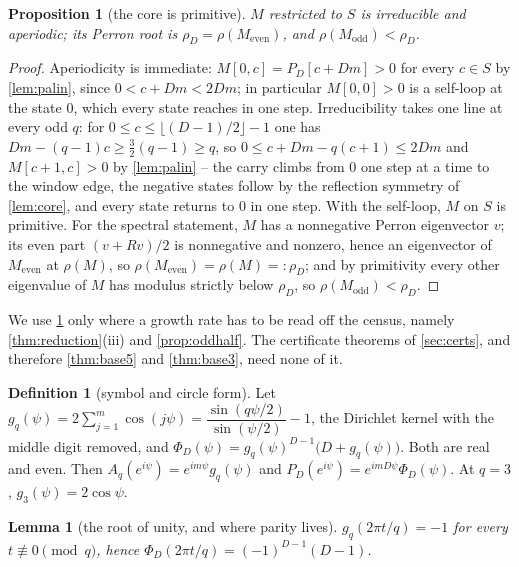 \documentclass[11pt]{amsart}
\newtheorem{proposition}[theorem]{Proposition}
\newtheorem{lemma}[theorem]{Lemma}
\theoremstyle{definition}
\newtheorem{definition}[theorem]{Definition}
\theoremstyle{remark}
\begin{document}
\begin{proposition}[the core is primitive]
\label{prop:core}
$M$ restricted to $S$ is irreducible and aperiodic; its Perron root is $\rho_D = \rho(M_{\mathrm{even}})$, and $\rho(M_{\mathrm{odd}}) < \rho_D$.
\end{proposition}

\begin{proof}
Aperiodicity is immediate: $M[0,c] = P_D[c + Dm] > 0$ for every $c \in S$ by \cref{lem:palin}, since $0 < c + Dm < 2Dm$; in particular $M[0,0] > 0$ is a self-loop at the state $0$, which every state reaches in one step. Irreducibility takes one line at every odd $q$: for $0 \le c \le \lfloor(D-1)/2\rfloor - 1$ one has $Dm - (q-1)c \ge \tfrac32(q-1) \ge q$, so $0 \le c + Dm - q(c+1) \le 2Dm$ and $M[c+1,c] > 0$ by \cref{lem:palin} -- the carry climbs from $0$ one step at a time to the window edge, the negative states follow by the reflection symmetry of \cref{lem:core}, and every state returns to $0$ in one step. With the self-loop, $M$ on $S$ is primitive. For the spectral statement, $M$ has a nonnegative Perron eigenvector $v$; its even part $(v + Rv)/2$ is nonnegative and nonzero, hence an eigenvector of $M_{\mathrm{even}}$ at $\rho(M)$, so $\rho(M_{\mathrm{even}}) = \rho(M) =: \rho_D$; and by primitivity every other eigenvalue of $M$ has modulus strictly below $\rho_D$, so $\rho(M_{\mathrm{odd}}) < \rho_D$.
\end{proof}

We use \cref{prop:core} only where a growth rate has to be read off the census, namely \cref{thm:reduction}(iii) and \cref{prop:oddhalf}. The certificate theorems of \cref{sec:certs}, and therefore \cref{thm:base5} and \cref{thm:base3}, need none of it.

\begin{definition}[symbol and circle form]
\label{def:symbol}
Let $g_q(\psi) = 2\sum_{j=1}^{m}\cos(j\psi) = \dfrac{\sin(q\psi/2)}{\sin(\psi/2)} - 1$, the Dirichlet kernel with the middle digit removed, and $\Phi_D(\psi) = g_q(\psi)^{D-1}\bigl(D + g_q(\psi)\bigr)$. Both are real and even. Then $A_q(e^{i\psi}) = e^{im\psi}g_q(\psi)$ and $P_D(e^{i\psi}) = e^{imD\psi}\Phi_D(\psi)$. At $q = 3$, $g_3(\psi) = 2\cos\psi$.
\end{definition}

\begin{lemma}[the root of unity, and where parity lives]
\label{lem:rootunity}
$g_q(2\pi t/q) = -1$ for every $t \not\equiv 0 \pmod q$, hence $\Phi_D(2\pi t/q) = (-1)^{D-1}(D-1)$.
\end{lemma}
\end{document}
